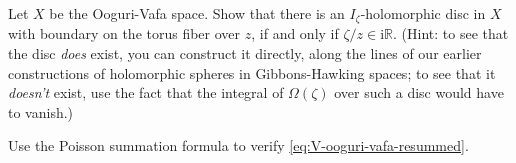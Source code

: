 \documentclass[12pt,letterpaper,reqno]{article}
\numberwithin{equation}{section}
\newcommand{\R}{\ensuremath{\mathbb R}}
\newcommand{\I}{{\mathrm i}}
\newcommand{\ti}[1]{\textit{#1}}
\newcommand{\fixme}[1]{{\color{orange}{[#1]}}}
\begin{document}
\begin{exercise} \label{exc:ooguri-vafa-holomorphic-discs} \cite{ovmh} Let $X$ be the Ooguri-Vafa space.
Show that there is an $I_\zeta$-holomorphic disc in $X$
with boundary on the torus fiber over $z$, if and
only if $\zeta / z \in \I \R$.
(Hint: to see that the disc \ti{does}
exist, you can construct it directly, along the lines of our
earlier constructions of holomorphic spheres in Gibbons-Hawking spaces;
to see that it \ti{doesn't} exist,
use the fact that the integral of $\Omega(\zeta)$ over such
a disc would have to vanish.)
\end{exercise}

\begin{exercise} Use the Poisson summation formula to verify
\eqref{eq:V-ooguri-vafa-resummed}. \fixme{warning, this is hard}
\end{exercise}
\end{document}
